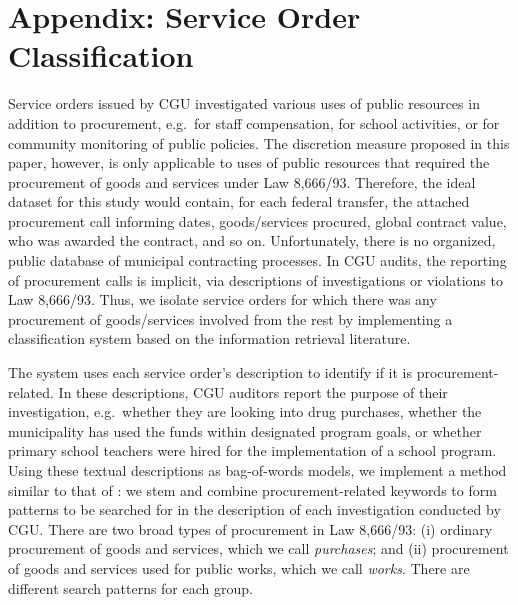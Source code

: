 \documentclass[11pt]{article}
\begin{document}




\clearpage

\appendix

\section{Appendix: Service Order Classification} \label{sec:appendixA}

Service orders issued by CGU investigated various uses of public resources in addition to procurement, e.g.~for staff compensation, for school activities, or for community monitoring of public policies. The discretion measure proposed in this paper, however, is only applicable to uses of public resources that required the procurement of goods and services under Law 8,666/93. Therefore, the ideal dataset for this study would contain, for each federal transfer, the attached procurement call informing dates, goods/services procured, global contract value, who was awarded the contract, and so on. Unfortunately, there is no organized, public database of municipal contracting processes. In CGU audits, the reporting of procurement calls is implicit, via descriptions of investigations or violations to Law 8,666/93. Thus, we isolate service orders for which there was any procurement of goods/services involved from the rest by implementing a classification system based on the information retrieval literature.

The system uses each service order's description to identify if it is procurement-related. In these descriptions, CGU auditors report the purpose of their investigation, e.g.~whether they are looking into drug purchases, whether the municipality has used the funds within designated program goals, or whether primary school teachers were hired for the implementation of a school program. Using these textual descriptions as bag-of-words models, we implement a method similar to that of \citet{HopkinsMethodAutomatedNonparametric2009}: we stem and combine procurement-related keywords to form patterns to be searched for in the description of each investigation conducted by CGU. There are two broad types of procurement in Law 8,666/93: (i) ordinary procurement of goods and services, which we call \emph{purchases}; and (ii) procurement of goods and services used for public works, which we call \emph{works}. There are different search patterns for each group.
\end{document}
